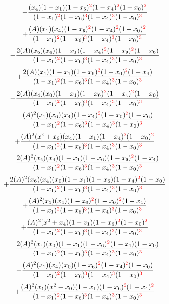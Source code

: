 \documentclass{article}
\begin{document}
\[+\frac{(x_4)(1-x_1)(1-x_6)^{\textcolor{red}{2}}(1-x_4)^{\textcolor{red}{2}}(1-x_0)^{\textcolor{red}{2}}}{(1-x_1)^{\textcolor{red}{2}}(1-x_6)^{\textcolor{red}{3}}(1-x_4)^{\textcolor{red}{3}}(1-x_0)^{\textcolor{red}{3}}}\]\[+\frac{(A)(x_1)(x_4)(1-x_6)^{\textcolor{red}{2}}(1-x_4)^{\textcolor{red}{2}}(1-x_0)^{\textcolor{red}{2}}}{(1-x_1)^{\textcolor{red}{2}}(1-x_6)^{\textcolor{red}{3}}(1-x_4)^{\textcolor{red}{3}}(1-x_0)^{\textcolor{red}{3}}}\]\[+\frac{2(A)(x_6)(x_4)(1-x_1)(1-x_4)^{\textcolor{red}{2}}(1-x_0)^{\textcolor{red}{2}}(1-x_6)}{(1-x_1)^{\textcolor{red}{2}}(1-x_6)^{\textcolor{red}{3}}(1-x_4)^{\textcolor{red}{3}}(1-x_0)^{\textcolor{red}{3}}}\]\[+\frac{2(A)(x_4)(1-x_1)(1-x_6)^{\textcolor{red}{2}}(1-x_0)^{\textcolor{red}{2}}(1-x_4)}{(1-x_1)^{\textcolor{red}{2}}(1-x_6)^{\textcolor{red}{3}}(1-x_4)^{\textcolor{red}{3}}(1-x_0)^{\textcolor{red}{3}}}\]\[+\frac{2(A)(x_4)(x_0)(1-x_1)(1-x_6)^{\textcolor{red}{2}}(1-x_4)^{\textcolor{red}{2}}(1-x_0)}{(1-x_1)^{\textcolor{red}{2}}(1-x_6)^{\textcolor{red}{3}}(1-x_4)^{\textcolor{red}{3}}(1-x_0)^{\textcolor{red}{3}}}\]\[+\frac{(A)^{2}(x_1)(x_6)(x_4)(1-x_4)^{\textcolor{red}{2}}(1-x_0)^{\textcolor{red}{2}}(1-x_6)}{(1-x_1)^{\textcolor{red}{2}}(1-x_6)^{\textcolor{red}{3}}(1-x_4)^{\textcolor{red}{3}}(1-x_0)^{\textcolor{red}{3}}}\]\[+\frac{(A)^{2}(x^{2}+x_6)(x_4)(1-x_1)(1-x_4)^{\textcolor{red}{2}}(1-x_0)^{\textcolor{red}{2}}}{(1-x_1)^{\textcolor{red}{2}}(1-x_6)^{\textcolor{red}{3}}(1-x_4)^{\textcolor{red}{3}}(1-x_0)^{\textcolor{red}{3}}}\]\[+\frac{2(A)^{2}(x_6)(x_4)(1-x_1)(1-x_6)(1-x_0)^{\textcolor{red}{2}}(1-x_4)}{(1-x_1)^{\textcolor{red}{2}}(1-x_6)^{\textcolor{red}{3}}(1-x_4)^{\textcolor{red}{3}}(1-x_0)^{\textcolor{red}{3}}}\]\[+\frac{2(A)^{2}(x_6)(x_4)(x_0)(1-x_1)(1-x_6)(1-x_4)^{\textcolor{red}{2}}(1-x_0)}{(1-x_1)^{\textcolor{red}{2}}(1-x_6)^{\textcolor{red}{3}}(1-x_4)^{\textcolor{red}{3}}(1-x_0)^{\textcolor{red}{3}}}\]\[+\frac{(A)^{2}(x_1)(x_4)(1-x_6)^{\textcolor{red}{2}}(1-x_0)^{\textcolor{red}{2}}(1-x_4)}{(1-x_1)^{\textcolor{red}{2}}(1-x_6)^{\textcolor{red}{3}}(1-x_4)^{\textcolor{red}{3}}(1-x_0)^{\textcolor{red}{3}}}\]\[+\frac{(A)^{2}(x^{2}+x_4)(1-x_1)(1-x_6)^{\textcolor{red}{2}}(1-x_0)^{\textcolor{red}{2}}}{(1-x_1)^{\textcolor{red}{2}}(1-x_6)^{\textcolor{red}{3}}(1-x_4)^{\textcolor{red}{3}}(1-x_0)^{\textcolor{red}{3}}}\]\[+\frac{2(A)^{2}(x_4)(x_0)(1-x_1)(1-x_6)^{\textcolor{red}{2}}(1-x_4)(1-x_0)}{(1-x_1)^{\textcolor{red}{2}}(1-x_6)^{\textcolor{red}{3}}(1-x_4)^{\textcolor{red}{3}}(1-x_0)^{\textcolor{red}{3}}}\]\[+\frac{(A)^{2}(x_1)(x_4)(x_0)(1-x_6)^{\textcolor{red}{2}}(1-x_4)^{\textcolor{red}{2}}(1-x_0)}{(1-x_1)^{\textcolor{red}{2}}(1-x_6)^{\textcolor{red}{3}}(1-x_4)^{\textcolor{red}{3}}(1-x_0)^{\textcolor{red}{3}}}\]\[+\frac{(A)^{2}(x_4)(x^{2}+x_0)(1-x_1)(1-x_6)^{\textcolor{red}{2}}(1-x_4)^{\textcolor{red}{2}}}{(1-x_1)^{\textcolor{red}{2}}(1-x_6)^{\textcolor{red}{3}}(1-x_4)^{\textcolor{red}{3}}(1-x_0)^{\textcolor{red}{3}}}\]
\end{document}
